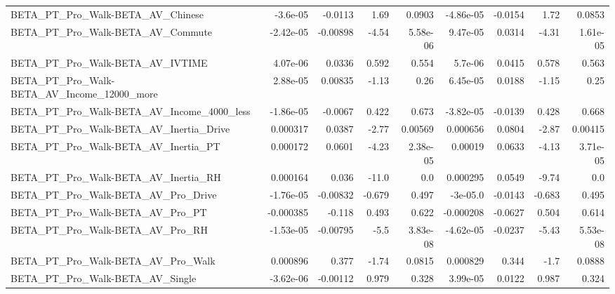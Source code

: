 \begin{tabular}{lrrrrrrrr}
BETA\_PT\_Pro\_Walk-BETA\_AV\_Chinese                   &    -3.6e-05 &      -0.0113 &     1.69 &   0.0903 &  -4.86e-05 &     -0.0154 &         1.72 &        0.0853 \\
BETA\_PT\_Pro\_Walk-BETA\_AV\_Commute                   &   -2.42e-05 &     -0.00898 &    -4.54 & 5.58e-06 &   9.47e-05 &      0.0314 &        -4.31 &      1.61e-05 \\
BETA\_PT\_Pro\_Walk-BETA\_AV\_IVTIME                    &    4.07e-06 &       0.0336 &    0.592 &    0.554 &    5.7e-06 &      0.0415 &        0.578 &         0.563 \\
BETA\_PT\_Pro\_Walk-BETA\_AV\_Income\_12000\_more         &    2.88e-05 &      0.00835 &    -1.13 &     0.26 &   6.45e-05 &      0.0188 &        -1.15 &          0.25 \\
BETA\_PT\_Pro\_Walk-BETA\_AV\_Income\_4000\_less          &   -1.86e-05 &      -0.0067 &    0.422 &    0.673 &  -3.82e-05 &     -0.0139 &        0.428 &         0.668 \\
BETA\_PT\_Pro\_Walk-BETA\_AV\_Inertia\_Drive             &    0.000317 &       0.0387 &    -2.77 &  0.00569 &   0.000656 &      0.0804 &        -2.87 &       0.00415 \\
BETA\_PT\_Pro\_Walk-BETA\_AV\_Inertia\_PT                &    0.000172 &       0.0601 &    -4.23 & 2.38e-05 &    0.00019 &      0.0633 &        -4.13 &      3.71e-05 \\
BETA\_PT\_Pro\_Walk-BETA\_AV\_Inertia\_RH                &    0.000164 &        0.036 &    -11.0 &      0.0 &   0.000295 &      0.0549 &        -9.74 &           0.0 \\
BETA\_PT\_Pro\_Walk-BETA\_AV\_Pro\_Drive                 &   -1.76e-05 &     -0.00832 &   -0.679 &    0.497 &   -3e-05.0 &     -0.0143 &       -0.683 &         0.495 \\
BETA\_PT\_Pro\_Walk-BETA\_AV\_Pro\_PT                    &   -0.000385 &       -0.118 &    0.493 &    0.622 &  -0.000208 &     -0.0627 &        0.504 &         0.614 \\
BETA\_PT\_Pro\_Walk-BETA\_AV\_Pro\_RH                    &   -1.53e-05 &     -0.00795 &     -5.5 & 3.83e-08 &  -4.62e-05 &     -0.0237 &        -5.43 &      5.53e-08 \\
BETA\_PT\_Pro\_Walk-BETA\_AV\_Pro\_Walk                  &    0.000896 &        0.377 &    -1.74 &   0.0815 &   0.000829 &       0.344 &         -1.7 &        0.0888 \\
BETA\_PT\_Pro\_Walk-BETA\_AV\_Single                    &   -3.62e-06 &     -0.00112 &    0.979 &    0.328 &   3.99e-05 &      0.0122 &        0.987 &         0.324 \\

\end{tabular}
